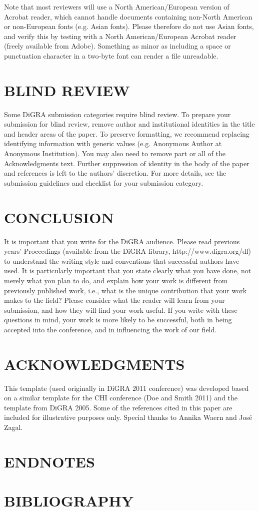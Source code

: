 \documentclass[11pt]{article}
\begin{document}
Note that most reviewers will use a North American/European version of Acrobat reader,
which cannot handle documents containing non-North American or non-European fonts
(e.g. Asian fonts). Please therefore do not use Asian fonts, and verify this by testing with
a North American/European Acrobat reader (freely available from Adobe). Something as
minor as including a space or punctuation character in a two-byte font can render a file
unreadable.
\section*{BLIND REVIEW}
Some DiGRA submission categories require blind review. To prepare your submission
for blind review, remove author and institutional identities in the title and header areas of
the paper. To preserve formatting, we recommend replacing identifying information with
generic values (e.g. Anonymous Author at Anonymous Institution). You may also need to
remove part or all of the Acknowledgments text. Further suppression of identity in the
body of the paper and references is left to the authors' discretion. For more details, see the
submission guidelines and checklist for your submission category.
\section*{CONCLUSION}
It is important that you write for the DiGRA audience. Please read previous years'
Proceedings (available from the DiGRA library, http://www.digra.org/dl) to understand
the writing style and conventions that successful authors have used. It is particularly
important that you state clearly what you have done, not merely what you plan to do, and
explain how your work is different from previously published work, i.e., what is the
unique contribution that your work makes to the field? Please consider what the reader 
will learn from your submission, and how they will find your work useful. If you write
with these questions in mind, your work is more likely to be successful, both in being
accepted into the conference, and in influencing the work of our field.
\section*{ACKNOWLEDGMENTS}
This template (used originally in DiGRA 2011 conference) was developed based on a
similar template for the CHI conference (Doe and Smith 2011) and the template from
DiGRA 2005. Some of the references cited in this paper are included for illustrative
purposes only. Special thanks to Annika Waern and José Zagal.
\section*{ENDNOTES}
\theendnotes

\section*{BIBLIOGRAPHY}
\printbibliography
\end{document}
